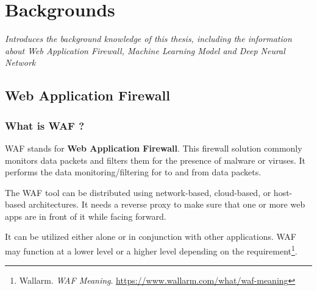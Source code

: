 \chapter{Backgrounds}
\label{chap:backgrounds}
	\textit{Introduces the background knowledge of this thesis, including the information about Web Application Firewall, Machine Learning Model and Deep Neural Network}
\minitoc

\section{Web Application Firewall} 
\label{sec:waf}
	
\subsection{What is WAF ?}
\label{subsec:waf_def}
WAF stands for \textbf{Web Application Firewall}. This firewall solution commonly monitors data packets and filters them for the presence of malware or viruses. It performs the data monitoring/filtering for to and from data packets.  

The WAF tool can be distributed using network-based, cloud-based, or host-based architectures. It needs a reverse proxy to make sure that one or more web apps are in front of it while facing forward. 

It can be utilized either alone or in conjunction with other applications. WAF may function at a lower level or a higher level depending on the requirement\footnote{Wallarm. \textit{WAF Meaning}. \url{https://www.wallarm.com/what/waf-meaning}}.


